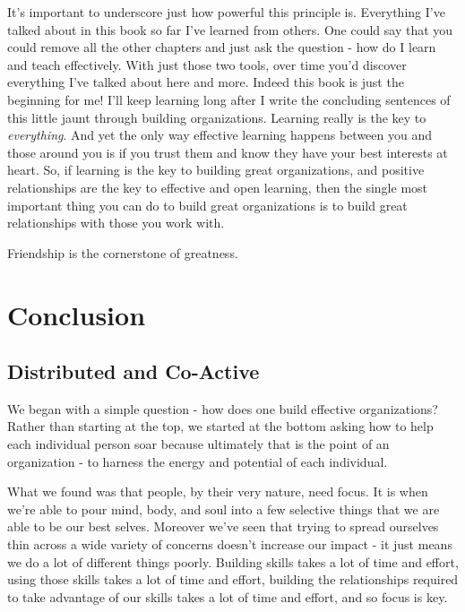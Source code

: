 \documentclass[11pt,a5paper]{book}
\begin{document}
It's important to underscore just how powerful this principle is. Everything I've talked about in this book so far I've learned from others. One could say that you could remove all the other chapters and just ask the question - how do I learn and teach effectively. With just those two tools, over time you'd discover everything I've talked about here and more. Indeed this book is just the beginning for me! I'll keep learning long after I write the concluding sentences of this little jaunt through building organizations. Learning really is the key to \textit{everything}. And yet the only way effective learning happens between you and those around you is if you trust them and know they have your best interests at heart. So, if learning is the key to building great organizations, and positive relationships are the key to effective and open learning, then the single most important thing you can do to build great organizations is to build great relationships with those you work with.
\newline

Friendship is the cornerstone of greatness.


\part{Conclusion}

\chapter{Distributed and Co-Active}
We began with a simple question - how does one build effective organizations? Rather than starting at the top, we started at the bottom asking how to help each individual person soar because ultimately that is the point of an organization - to harness the energy and potential of each individual. 
\newline

What we found was that people, by their very nature, need focus. It is when we're able to pour mind, body, and soul into a few selective things that we are able to be our best selves. Moreover we've seen that trying to spread ourselves thin across a wide variety of concerns doesn't increase our impact - it just means we do a lot of different things poorly. Building skills takes a lot of time and effort, using those skills takes a lot of time and effort, building the relationships required to take advantage of our skills takes a lot of time and effort, and so focus is key.
\newline
\end{document}
